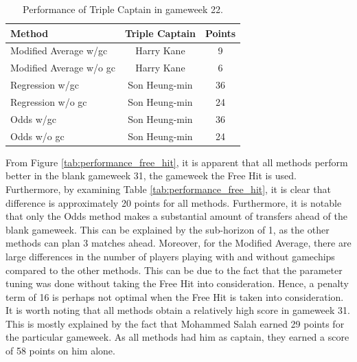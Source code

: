 \begin{table}[H]
\centering
\begin{tabular}{@{}lcc@{}}
\toprule
                 Method       & Triple Captain & Points \\ \midrule
Modified Average w/gc   & Harry Kane           & 9      \\
Modified Average w/o gc & Harry Kane           & 6      \\
Regression w/gc         & Son Heung-min            & 36     \\
Regression w/o gc       & Son Heung-min            & 24     \\
Odds w/gc               & Son Heung-min            & 36     \\
Odds w/o gc             & Son Heung-min            & 24     \\ \bottomrule
\end{tabular}
\caption{Performance of Triple Captain in gameweek 22.}
\label{tab:performance_triple_captain}
\end{table}

\newpar 

From Figure \ref{tab:performance_free_hit}, it is apparent that all methods perform better in the blank gameweek 31, the gameweek the Free Hit is used. Furthermore, by examining Table \ref{tab:performance_free_hit}, it is clear that difference is approximately 20 points for all methods. Furthermore, it is notable that only the Odds method makes a substantial amount of transfers ahead of the blank gameweek. This can be explained by the sub-horizon of 1, as the other methods can plan 3 matches ahead. Moreover, for the Modified Average, there are large differences in the number of players playing with and without gamechips compared to the other methods. This can be due to the fact that the parameter tuning was done without taking the Free Hit into consideration. Hence, a penalty term of 16 is perhaps not optimal when the Free Hit is taken into consideration. It is worth noting that all methods obtain a relatively high score in gameweek 31. This is mostly explained by the fact that Mohammed Salah earned 29 points for the particular gameweek. As all methods had him as captain, they earned a score of 58 points on him alone.

